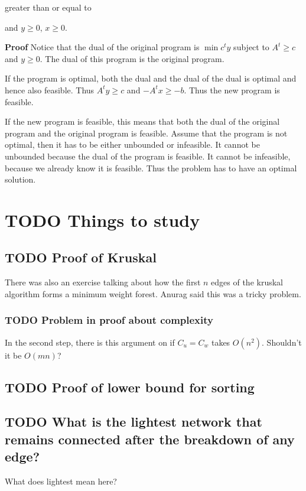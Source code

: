 \documentclass[11pt]{article}
\def\min{\operatorname{min}}
\begin{document}
greater than or equal to

and \(y \ge 0\), \(x \ge 0\).

\textbf{Proof} Notice that the dual of the original program is \(\min c^t y\)
subject to \(A^t \ge c\) and \(y \ge 0\). The dual of this program is the
original program.

If the program is optimal, both the dual and the dual of the dual is optimal
and hence also feasible. Thus \(A^t y \ge c\) and \(-A^tx \ge -b\). Thus the new
program is feasible.

If the new program is feasible, this means that both the dual of the
original program and the original program is feasible. Assume that the
program is not optimal, then it has to be either unbounded or infeasible. It
cannot be unbounded because the dual of the program is feasible. It cannot
be infeasible, because we already know it is feasible. Thus the problem has
to have an optimal solution.
\section{{\bfseries\sffamily TODO} Things to study}
\label{sec:org24cee0c}
\subsection{{\bfseries\sffamily TODO} Proof of Kruskal}
\label{sec:org8ac4a10}
There was also an exercise talking about how the first \(n\) edges of the
kruskal algorithm forms a minimum weight forest. Anurag said this was a
tricky problem.
\subsubsection{{\bfseries\sffamily TODO} Problem in proof about complexity}
\label{sec:org1a562c0}
In the second step, there is this argument on if \(C_u = C_w\) takes \(O(n^2)\).
Shouldn't it be \(O(mn)\)?
\subsection{{\bfseries\sffamily TODO} Proof of lower bound for sorting}
\label{sec:org066c3bb}
\subsection{{\bfseries\sffamily TODO} What is the lightest network that remains connected after the breakdown of any edge?}
\label{sec:orgdc6a991}
What does lightest mean here? 
\end{document}
